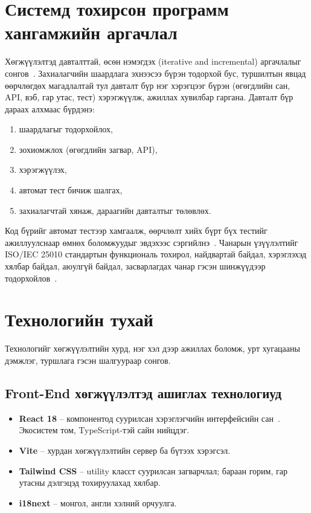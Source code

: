 \section{Системд тохирсон программ хангамжийн аргачлал}
Хөгжүүлэлтэд давталттай, өсөн нэмэгдэх (iterative and incremental) аргачлалыг сонгов~\cite{sommerville}. Захиалагчийн шаардлага эхнээсээ бүрэн тодорхой бус, туршилтын явцад өөрчлөгдөх магадлалтай тул давталт бүр нэг хэрэгцээг бүрэн (өгөгдлийн сан, API, вэб, гар утас, тест) хэрэгжүүлж, ажиллах хувилбар гаргана. Давталт бүр дараах алхмаас бүрдэнэ:
\begin{enumerate}[nosep]
    \item шаардлагыг тодорхойлох,
    \item зохиомжлох (өгөгдлийн загвар, API),
    \item хэрэгжүүлэх,
    \item автомат тест бичиж шалгах,
    \item захиалагчтай хянаж, дараагийн давталтыг төлөвлөх.
\end{enumerate}
Код бүрийг автомат тестээр хамгаалж, өөрчлөлт хийх бүрт бүх тестийг ажиллуулснаар өмнөх боломжуудыг эвдэхээс сэргийлнэ~\cite{beck}. Чанарын үзүүлэлтийг ISO/IEC 25010 стандартын функциональ тохирол, найдвартай байдал, хэрэглэхэд хялбар байдал, аюулгүй байдал, засварлагдах чанар гэсэн шинжүүдээр тодорхойлов~\cite{iso25010}.

\section{Технологийн тухай}
Технологийг хөгжүүлэлтийн хурд, нэг хэл дээр ажиллах боломж, урт хугацааны дэмжлэг, туршлага гэсэн шалгуураар сонгов.

\subsection{Front-End хөгжүүлэлтэд ашиглах технологиуд}
\begin{itemize}
    \item \textbf{React 18} -- компонентод суурилсан хэрэглэгчийн интерфейсийн сан~\cite{react}. Экосистем том, TypeScript-тэй сайн нийцдэг.
    \item \textbf{Vite} -- хурдан хөгжүүлэлтийн сервер ба бүтээх хэрэгсэл.
    \item \textbf{Tailwind CSS} -- utility класст суурилсан загварчлал; бараан горим, гар утасны дэлгэцэд тохируулахад хялбар.
    \item \textbf{i18next} -- монгол, англи хэлний орчуулга.
\end{itemize}

